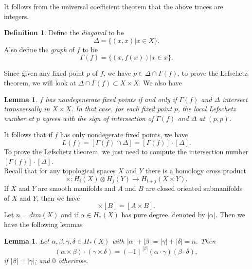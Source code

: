 \documentclass[psamsfonts]{amsart}
\newtheorem{lem}[theorem]{Lemma}
\theoremstyle{definition}
\newtheorem{defn}[theorem]{Definition}
\theoremstyle{remark}
\numberwithin{equation}{section}
\begin{document}
		It follows from the universal coefficient theorem that the above traces are integers.
		\begin{defn}
			Define the \textit{diagonal} to be
			\begin{equation}
				\Delta = \{(x,x) | x\in X \}.
			\end{equation}
			Also define the \textit{graph} of $f$ to be
			\begin{equation}
				\Gamma (f) = \{ (x,f(x)) | x\in x \}.
			\end{equation}
		\end{defn}
		Since given any fixed point $p$ of $f$, we have $p \in \Delta \cap \Gamma (f)$, to prove the Lefschetz theorem, we will look at $\Delta \cap \Gamma (f) \subset X \times X$. We also have
		\begin{lem}
			$f$ has nondegenerate fixed points if and only if $\Gamma(f)$ and $\Delta$ intersect transversally in $X \times X$. In that case, for each fixed point $p$, the local Lefschetz number at $p$ agrees with the sign of intersection of $\Gamma (f)$ and $\Delta$ at $(p,p)$.
		\end{lem}
		It follows that if $f$ has only nondegerate fixed points, we have
		\begin{equation}
			L(f) = [\Gamma(f) \cap \Delta] = [\Gamma(f)] \cdot [\Delta].
		\end{equation}
		To prove the Lefschetz theorem, we just need to compute the intersection number $[\Gamma(f)] \cdot [\Delta]$.\\
		\indent Recall that for any topological spaces $X$ and $Y$ there is a homology cross product
		\begin{equation}
			\times : H_i(X) \otimes H_j(Y) \to H_{i+j}(X \times Y).
		\end{equation}
		If $X$ and $Y$ are smooth manifolds and $A$ and $B$ are closed oriented submanifolds of $X$ and $Y$, then we have 
		\begin{equation}
			[A] \times [B] = [A \times B].
		\end{equation}
		Let $n = dim(X)$ and if $\alpha \in H_*(X)$ has pure degree, denoted by $|\alpha|$. Then we have the following lemmas
		\begin{lem}
			Let $\alpha, \beta, \gamma, \delta \in H_*(X)$ with $|\alpha|+|\beta|=|\gamma|+|\delta| = n$. Then
			\begin{equation}
				(\alpha \times \beta)\cdot (\gamma \times \delta) = (-1)^{|\beta|} (\alpha \cdot \gamma)(\beta \cdot \delta),
			\end{equation}
			if $|\beta| = |\gamma|$; and $0$ otherwise.
		\end{lem}
\end{document}
